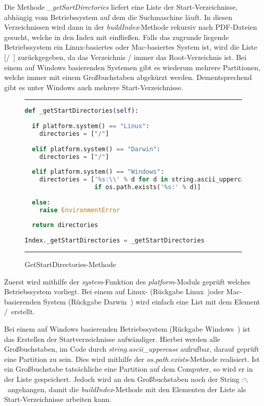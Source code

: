 Die Methode \textit{\_getSartDirectories} liefert eine Liste der Start-Verzeichnisse, abhängig vom Betriebssystem auf dem die Suchmaschine läuft. In diesen Verzeichnissen wird dann in der \textit{buildIndex}-Methode rekursiv nach PDF-Dateien gesucht, welche in den Index mit einfließen. Falls das zugrunde liegende Betriebssystem ein Linux-basiertes oder Mac-basiertes System ist, wird die Liste [\glqq /\grqq\ ] zurückgegeben, da das Verzeichnis / immer das Root-Verzeichnis ist. Bei einem auf Windows basierenden Systemen gibt es wiederum mehrere Partitionen, welche immer mit einem Großbuchstaben abgekürzt werden. Dementsprechend gibt es unter Windows auch mehrere Start-Verzeichnisse.

\begin{figure}
	\rule{\textwidth}{0.4pt}
	\begin{lstlisting}[language=Python]
def _getStartDirectories(self):
	
  if platform.system() == "Linux":
    directories = ["/"]
	
  elif platform.system() == "Darwin":
    directories = ["/"]
	
  elif platform.system() == "Windows":
    directories = ['%s:\\' % d for d in string.ascii_uppercase
                   if os.path.exists('%s:' % d)]
	
  else:
    raise EnvironmentError
	
  return directories
	
Index._getStartDirectories = _getStartDirectories
	\end{lstlisting}
	\rule{\textwidth}{0.4pt}
	\caption{GetStartDirectories-Methode}
	\label{fig:start}
\end{figure}

Zuerst wird mithilfe der \textit{system}-Funktion des \textit{platform}-Moduls geprüft welches Betriebssystem vorliegt. Bei einem auf Linux- (Rückgabe \glqq Linux\grqq\ )oder Mac-basierenden System (Rückgabe \glqq Darwin\grqq\ ) wird einfach eine List mit dem Element \glqq /\grqq\ erstellt.

Bei einem auf Windows basierenden Betriebssystem (Rückgabe \glqq Windows\grqq\ ) ist das Erstellen der Startverzeichnisse aufwändiger. Hierbei werden alle Großbuchstaben, im Code durch \textit{string.ascii\_uppercase} aufrufbar, darauf geprüft eine Partition zu sein. Dies wird mithilfe der \textit{os.path.exists}-Methode realisiert. Ist ein Großbuchstabe tatsächliche eine Partition auf dem Computer, so wird er in der Liste gespeichert. Jedoch wird an den Großbuchstaben noch der String \glqq :$\backslash$\grqq\ angehangen, damit die \textit{buildIndex}-Methode mit den Elementen der Liste als Start-Verzeichnisse arbeiten kann.

